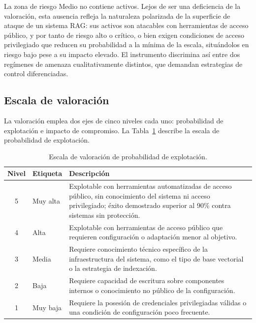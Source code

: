 La zona de riesgo Medio no contiene activos. Lejos de ser una deficiencia de la valoración, esta ausencia refleja la naturaleza polarizada de la superficie de ataque de un sistema RAG: sus activos son atacables con herramientas de acceso público, y por tanto de riesgo alto o crítico, o bien exigen condiciones de acceso privilegiado que reducen su probabilidad a la mínima de la escala, situándolos en riesgo bajo pese a su impacto elevado. El instrumento discrimina así entre dos regímenes de amenaza cualitativamente distintos, que demandan estrategias de control diferenciadas.

\subsection{Escala de valoración}

La valoración emplea dos ejes de cinco niveles cada uno: probabilidad de explotación e impacto de compromiso. La Tabla~\ref{tab:escala-prob} describe la escala de probabilidad de explotación.

\begin{table}[H]
  \centering
  \caption{Escala de valoración de probabilidad de explotación.}
  \label{tab:escala-prob}
  \begin{tabularx}{\textwidth}{@{} c l >{\raggedright\arraybackslash}X @{}}
    \toprule
    \textbf{Nivel} & \textbf{Etiqueta} & \textbf{Descripción} \\
    \midrule
    5 & Muy alta & Explotable con herramientas automatizadas de acceso público, sin conocimiento del sistema ni acceso privilegiado; éxito demostrado superior al 90\% contra sistemas sin protección. \\
    4 & Alta     & Explotable con herramientas de acceso público que requieren configuración o adaptación menor al objetivo. \\
    3 & Media    & Requiere conocimiento técnico específico de la infraestructura del sistema, como el tipo de base vectorial o la estrategia de indexación. \\
    2 & Baja     & Requiere capacidad de escritura sobre componentes internos o conocimiento no público de la configuración. \\
    1 & Muy baja & Requiere la posesión de credenciales privilegiadas válidas o una condición de configuración poco frecuente. \\
    \bottomrule
  \end{tabularx}
\end{table}

